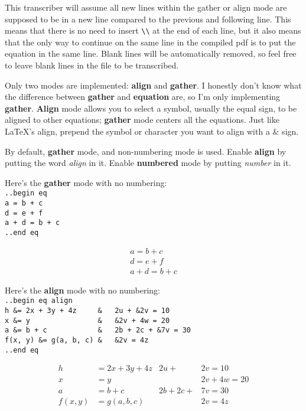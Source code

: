 \documentclass[12pt]{article}
\newcommand{\ital}{\emph}
\newcommand{\nl}{\\}
\renewcommand\bold{\textbf}
\begin{document}
\begin{flushleft}
\medskip

This transcriber will assume all new lines within the gather or align mode are supposed to be in a new line compared to the previous and following line. This means that there is no need to insert \verb|\\| at the end of each line, but it also means that the only way to continue on the same line in the compiled pdf is to put the equation in the same line. Blank lines will be automatically removed, so feel free to leave blank lines in the file to be transcribed.

\medskip

Only two modes are implemented: \bold{align} and \bold{gather}. I honestly don't know what the difference between \bold{gather} and \bold{equation} are, so I'm only implementing \bold{gather}. \bold{Align} mode allows you to select a symbol, usually the equal sign, to be aligned to other equations; \bold{gather} mode centers all the equations. Just like LaTeX's align, prepend the symbol or character you want to align with a \& sign.

\medskip

By default, \bold{gather} mode, and non-numbering mode is used. Enable \bold{align} by putting the word \ital{align} in it. Enable \bold{numbered} mode by putting \ital{number} in it.

\medskip

Here's the \bold{gather} mode with no numbering: \nl
\verb|..begin eq|\nl
\verb|a = b + c|\nl
\verb|d = e + f|\nl
\verb|a + d = b + c|\nl
\verb|..end eq|

\begin{gather*}
a = b + c \\
d = e + f \\
a + d = b + c 
\end{gather*}

\medskip

Here's the \bold{align} mode with no numbering: \nl
\verb|..begin eq align|\nl
\verb|h &= 2x + 3y + 4z     &   2u + &2v = 10|\nl
\verb|x &= y                &   &2v + 4w = 20|\nl
\verb|a &= b + c            &   2b + 2c + &7v = 30|\nl
\verb|f(x, y) &= g(a, b, c) &   &2v = 4z|\nl
\verb|..end eq|

\begin{align*}
h &= 2x + 3y + 4z			&	2u + &2v = 10 \\
x &= y						&	&2v + 4w = 20 \\
a &= b + c					&	2b + 2c + &7v = 30 \\
f(x, y) &= g(a, b, c)		&	&2v = 4z 
\end{align*}


\end{flushleft}
\end{document}
